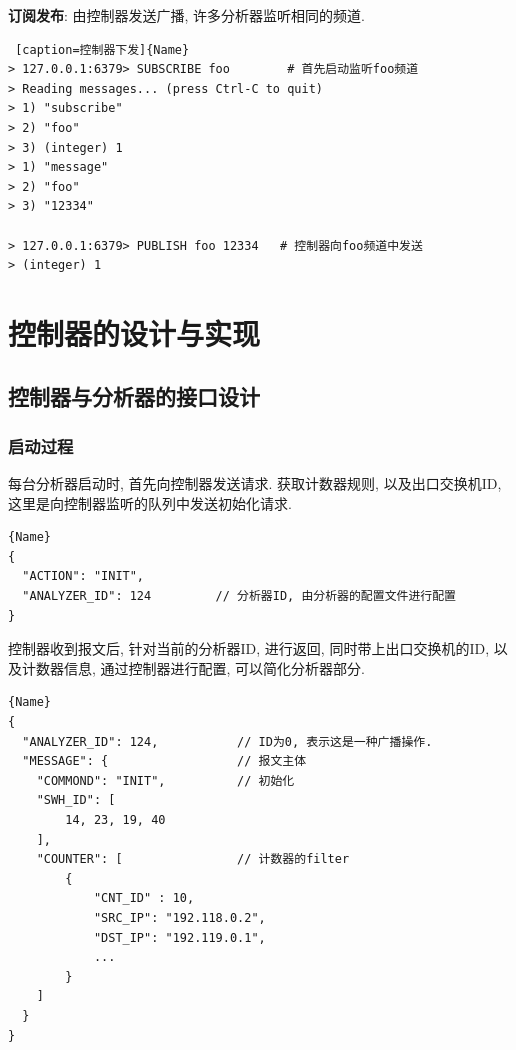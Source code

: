 \textbf{订阅发布}: 由控制器发送广播, 许多分析器监听相同的频道.


\begin{lstlisting} [caption=控制器下发]{Name}
> 127.0.0.1:6379> SUBSCRIBE foo        # 首先启动监听foo频道
> Reading messages... (press Ctrl-C to quit)
> 1) "subscribe"
> 2) "foo"
> 3) (integer) 1
> 1) "message"
> 2) "foo"
> 3) "12334"

> 127.0.0.1:6379> PUBLISH foo 12334   # 控制器向foo频道中发送
> (integer) 1
\end{lstlisting}




\chapter{控制器的设计与实现}

\section{控制器与分析器的接口设计}
\label{sec:分析器, 控制器接口设计}

\subsection{启动过程}

每台分析器启动时, 首先向控制器发送请求. 获取计数器规则, 以及出口交换机ID,
这里是向控制器监听的队列中发送初始化请求.

\begin{lstlisting}[caption=分析器初始化请求]{Name}
{
  "ACTION": "INIT",
  "ANALYZER_ID": 124         // 分析器ID, 由分析器的配置文件进行配置
}
\end{lstlisting}

控制器收到报文后, 针对当前的分析器ID, 进行返回, 同时带上出口交换机的ID,
以及计数器信息, 通过控制器进行配置, 可以简化分析器部分.

\begin{lstlisting}[caption=控制器返回报文]{Name}
{
  "ANALYZER_ID": 124,           // ID为0, 表示这是一种广播操作.
  "MESSAGE": {                  // 报文主体
    "COMMOND": "INIT",          // 初始化
    "SWH_ID": [
        14, 23, 19, 40
    ],
    "COUNTER": [                // 计数器的filter
        {
            "CNT_ID" : 10,
            "SRC_IP": "192.118.0.2",
            "DST_IP": "192.119.0.1",
            ...
        }
    ]
  }
}
\end{lstlisting}

